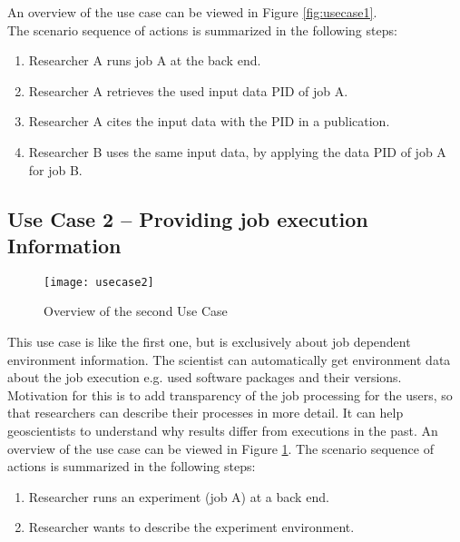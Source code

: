 \documentclass[draft,final]{vutinfth} %
\begin{document}
An overview of the use case can be viewed in Figure \ref{fig:usecase1}. \\

The scenario sequence of actions is summarized in the following steps: \\

\begin{enumerate}
	\item Researcher A runs job A at the back end.
	\item Researcher A retrieves the used input data PID of job A.
	\item Researcher A cites the input data with the PID in a publication.
	\item Researcher B uses the same input data, by applying the data PID of job A for job B.  
\end{enumerate}

\subsection{Use Case 2 – Providing job execution Information}\label{UseCase2}
\begin{figure}[h]
	\centering
	\texttt{[image: usecase2]}
	\caption{Overview of the second Use Case}
	\label{fig:usecase2} %
\end{figure}

This use case is like the first one, but is exclusively about job dependent environment information. The scientist can automatically get environment data about the job execution e.g. used software packages and their versions. Motivation for this is to add transparency of the job processing for the users, so that researchers can describe their processes in more detail. It can help geoscientists to understand why results differ from executions in the past. An overview of the use case can be viewed in Figure \ref{fig:usecase2}. 
The scenario sequence of actions is summarized in the following steps: \\
\begin{enumerate}
	\item Researcher runs an experiment (job A) at a back end.
	\item Researcher wants to describe the experiment environment.
\end{enumerate}
\end{document}
